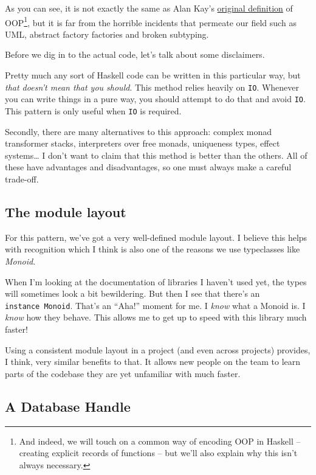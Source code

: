As you can see, it is not exactly the same as Alan Kay's
\href{http://wiki.c2.com/?AlanKaysDefinitionOfObjectOriented}{original
definition} of
OOP\footnote{And indeed, we will touch on a common way of encoding OOP in Haskell
  -- creating explicit records of functions -- but we'll also explain
  why this isn't always
  necessary.},
but it is far from the horrible incidents that permeate our field such
as UML, abstract factory factories and broken subtyping.

Before we dig in to the actual code, let's talk about some disclaimers.

Pretty much any sort of Haskell code can be written in this particular
way, but \emph{that doesn't mean that you should}. This method relies
heavily on \texttt{IO}. Whenever you can write things in a pure way, you
should attempt to do that and avoid \texttt{IO}. This pattern is only
useful when \texttt{IO} is required.

Secondly, there are many alternatives to this approach: complex monad
transformer stacks, interpreters over free monads, uniqueness types,
effect systems\ldots{} I don't want to claim that this method is better
than the others. All of these have advantages and disadvantages, so one
must always make a careful trade-off.

\hypertarget{the-module-layout}{%
\subsection{The module layout}\label{the-module-layout}}

For this pattern, we've got a very well-defined module layout. I believe
this helps with recognition which I think is also one of the reasons we
use typeclasses like \emph{Monoid}.

When I'm looking at the documentation of libraries I haven't used yet,
the types will sometimes look a bit bewildering. But then I see that
there's an \texttt{instance\ Monoid}. That's an ``Aha!'' moment for me.
I \emph{know} what a Monoid is. I \emph{know} how they behave. This
allows me to get up to speed with this library much faster!

Using a consistent module layout in a project (and even across projects)
provides, I think, very similar benefits to that. It allows new people
on the team to learn parts of the codebase they are yet unfamiliar with
much faster.

\subsection{A Database Handle}

